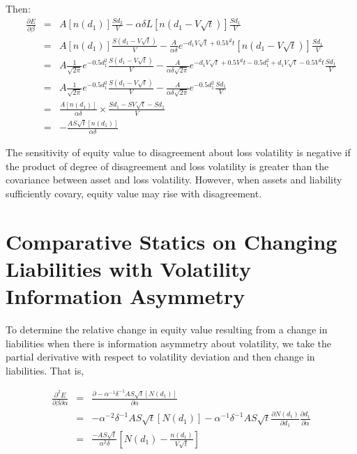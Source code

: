 \documentclass[11pt]{article}
\begin{document}
Then:
\begin{eqnarray}
\frac{\partial E}{\partial \beta}&=&A \left[n\left(d_1\right)\right]\frac{Sd_2}{V}-\alpha \delta L \left[n\left(d_1-V\sqrt{t} \right)\right]\frac{Sd_1}{V}\nonumber \\
&=&A \left[n\left(d_1\right)\right] \frac{S\left(d_1-V\sqrt{t}\right)}{V}-\frac{A}{\alpha \delta} e^{-d_1 V\sqrt{t}+0.5V^2 t} \left[n\left(d_1-V\sqrt{t}\right)\right] \frac{Sd_1}{V} \nonumber \\
&=&A\frac{1}{\sqrt{2 \pi}} e^{-0.5 d_1^2}\frac{S\left(d_1-V\sqrt{t}\right)}{V}-\frac{A}{\alpha \delta \sqrt{2\pi}}e^{-d_1 V\sqrt{t}+0.5V^2 t-0.5d_1^2+d_1 V\sqrt{t}-0.5V^2t}\frac{Sd_1}{V} \nonumber \\
&=&A\frac{1}{\sqrt{2 \pi}} e^{-0.5 d_1^2}\frac{S\left(d_1-V\sqrt{t}\right)}{V}-\frac{A}{\alpha \delta \sqrt{2\pi}}e^{-0.5 d_1^2}\frac{Sd_1}{V} \nonumber \\
&=&\frac{A \left[n\left(d_1\right)\right]}{\alpha\delta}\times \frac{Sd_1-SV\sqrt{t}-Sd_1}{V} \nonumber\\
&=&-\frac{AS\sqrt{t} \left[n\left(d_1\right)\right]}{\alpha\delta}
\end{eqnarray}


The sensitivity of equity value to disagreement about loss volatility is negative if the product of degree of disagreement and loss volatility is greater than the covariance between asset and loss volatility.  However, when assets and liability sufficiently covary, equity value may rise with disagreement.

\section{Comparative Statics on Changing Liabilities with Volatility Information Asymmetry}
To determine the relative change in equity value resulting from a change in liabilities when there is information asymmetry about volatility, we take the partial derivative with respect to volatility deviation and then change in liabilities. That is,

\begin{eqnarray}
\frac{\partial^2 E}{\partial \beta \partial \alpha} &=& \frac{\partial -\alpha^{-1} \delta^{-1} A S \sqrt{t} \left[N\left(d_1\right)\right]}{\partial \alpha} \nonumber\\
&=& -\alpha^{-2} \delta^{-1} A S \sqrt{t} \left[N\left(d_1\right)\right] -\alpha^{-1} \delta^{-1} A S \sqrt{t} \frac{\partial N\left(d_1\right)}{\partial d_1} \frac{\partial d_1}{\partial \alpha} \nonumber \\
&=& \frac{-AS\sqrt{t}}{\alpha^2 \delta}\left[N\left(d_1\right)-\frac{n\left(d_1\right)}{V \sqrt{t}} \right]
\end{eqnarray}
\end{document}
